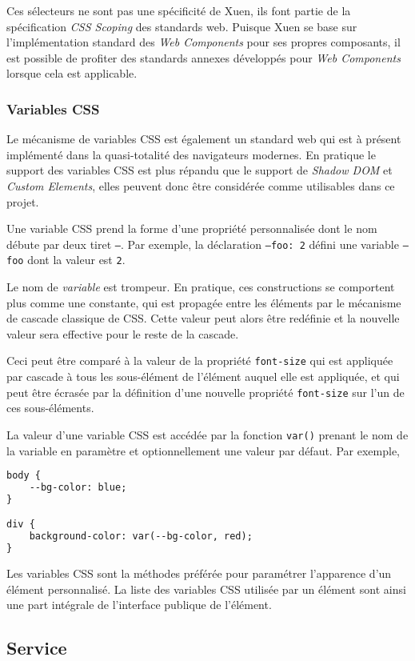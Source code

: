Ces sélecteurs ne sont pas une spécificité de Xuen, ils font partie de la spécification \emph{CSS Scoping} des standards web. Puisque Xuen se base sur l'implémentation standard des \emph{Web Components} pour ses propres composants, il est possible de profiter des standards annexes développés pour \emph{Web Components} lorsque cela est applicable.

\subsubsection{Variables CSS}
Le mécanisme de variables CSS est également un standard web qui est à présent implémenté dans la quasi-totalité des navigateurs modernes. En pratique le support des variables CSS est plus répandu que le support de \emph{Shadow DOM} et \emph{Custom Elements}, elles peuvent donc être considérée comme utilisables dans ce projet.

Une variable CSS prend la forme d'une propriété personnalisée dont le nom débute par deux tiret \texttt{--}. Par exemple, la déclaration \texttt{--foo: 2} défini une variable \texttt{--foo} dont la valeur est \texttt{2}.

Le nom de \emph{variable} est trompeur. En pratique, ces constructions se comportent plus comme une constante, qui est propagée entre les éléments par le mécanisme de cascade classique de CSS. Cette valeur peut alors être redéfinie et la nouvelle valeur sera effective pour le reste de la cascade.

Ceci peut être comparé à la valeur de la propriété \texttt{font-size} qui est appliquée par cascade à tous les sous-élément de l'élément auquel elle est appliquée, et qui peut être écrasée par la définition d'une nouvelle propriété \texttt{font-size} sur l'un de ces sous-éléments.

La valeur d'une variable CSS est accédée par la fonction \texttt{var()} prenant le nom de la variable en paramètre et optionnellement une valeur par défaut. Par exemple,
\begin{lstlisting}[language=HTML]
body {
	--bg-color: blue;
}

div {
	background-color: var(--bg-color, red);
}
\end{lstlisting}

Les variables CSS sont la méthodes préférée pour paramétrer l'apparence d'un élément personnalisé. La liste des variables CSS utilisée par un élément sont ainsi une part intégrale de l'interface publique de l'élément.

\subsection{Service}

